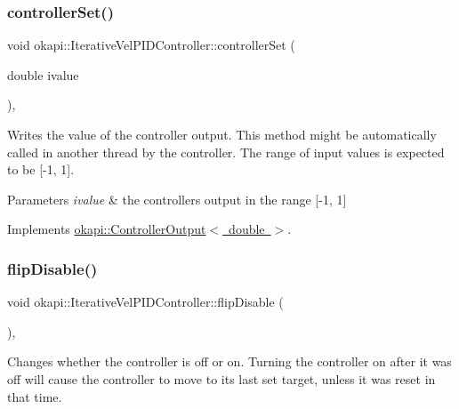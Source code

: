 \subsubsection{\texorpdfstring{controllerSet()}{controllerSet()}}
{\footnotesize\ttfamily void okapi\+::\+Iterative\+Vel\+P\+I\+D\+Controller\+::controller\+Set (\begin{DoxyParamCaption}\item[{double}]{ivalue }\end{DoxyParamCaption})\hspace{0.3cm}{\ttfamily [override]}, {\ttfamily [virtual]}}

Writes the value of the controller output. This method might be automatically called in another thread by the controller. The range of input values is expected to be \mbox{[}-\/1, 1\mbox{]}.


\begin{DoxyParams}{Parameters}
{\em ivalue} & the controller\textquotesingle{}s output in the range \mbox{[}-\/1, 1\mbox{]} \\
\hline
\end{DoxyParams}


Implements \mbox{\hyperlink{classokapi_1_1ControllerOutput_a360c08f0c10b36f882d6d3100c2cad49}{okapi\+::\+Controller\+Output$<$ double $>$}}.

\mbox{\label{classokapi_1_1IterativeVelPIDController_a9a575df2d0a53ca71a812a86d673b8fa}} 
\subsubsection{\texorpdfstring{flipDisable()}{flipDisable()}\hspace{0.1cm}{\footnotesize\ttfamily [1/2]}}
{\footnotesize\ttfamily void okapi\+::\+Iterative\+Vel\+P\+I\+D\+Controller\+::flip\+Disable (\begin{DoxyParamCaption}{ }\end{DoxyParamCaption})\hspace{0.3cm}{\ttfamily [override]}, {\ttfamily [virtual]}}

Changes whether the controller is off or on. Turning the controller on after it was off will cause the controller to move to its last set target, unless it was reset in that time. 

